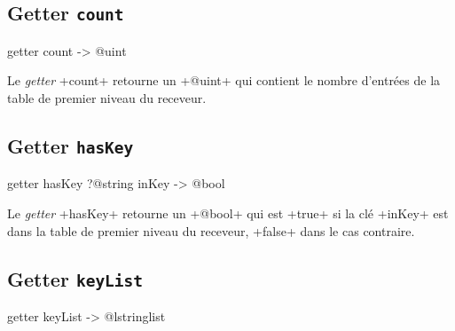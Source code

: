 %
%

\subsection{Getter \texttt{count}}

\begin{galgas}
getter count -> @uint
\end{galgas}


Le \emph{getter} \ggs+count+ retourne un \ggs+@uint+ qui contient le nombre d'entrées de la table de premier niveau du receveur.



\subsection{Getter \texttt{hasKey}}

\begin{galgas}
getter hasKey ?@string inKey -> @bool
\end{galgas}


Le \emph{getter} \ggs+hasKey+ retourne un \ggs+@bool+ qui est \ggs+true+ si la clé \ggs+inKey+ est dans la table de premier niveau du receveur, \ggs+false+ dans le cas contraire.



\subsection{Getter \texttt{keyList}}

\begin{galgas}
getter keyList -> @lstringlist
\end{galgas}



